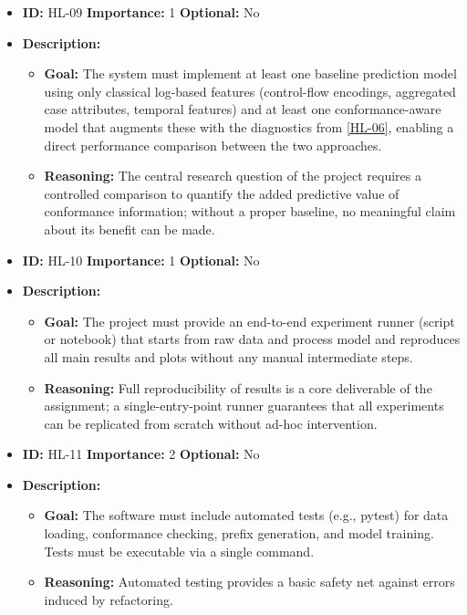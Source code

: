 \documentclass[12pt,a4paper]{article}
\begin{document}
\begin{itemize}
    \item \textbf{ID:} HL-09
 \textbf{Importance:} 1
 \textbf{Optional:} No
    \item \textbf{Description:}
    \begin{itemize}
        \item \textbf{Goal:} The system must implement at least one baseline prediction model using only classical log-based features (control-flow encodings, aggregated case attributes, temporal features) and at least one conformance-aware model that augments these with the diagnostics from \ref{HL-06}, enabling a direct performance comparison between the two approaches.
        \item \textbf{Reasoning:} The central research question of the project requires a controlled comparison to quantify the added predictive value of conformance information; without a proper baseline, no meaningful claim about its benefit can be made.
    \end{itemize}
\end{itemize}
\vspace{1.5em}

\begin{itemize}
    \item \textbf{ID:} HL-10
 \textbf{Importance:} 1
 \textbf{Optional:} No
    \item \textbf{Description:}
    \begin{itemize}
        \item \textbf{Goal:} The project must provide an end-to-end experiment runner (script or notebook) that starts from raw data and process model and reproduces all main results and plots without any manual intermediate steps.
        \item \textbf{Reasoning:} Full reproducibility of results is a core deliverable of the assignment; a single-entry-point runner guarantees that all experiments can be replicated from scratch without ad-hoc intervention.
    \end{itemize}
\end{itemize}
\vspace{1.5em}

\begin{itemize}
    \item \textbf{ID:} HL-11
 \textbf{Importance:} 2
 \textbf{Optional:} No
    \item \textbf{Description:}
    \begin{itemize}
        \item \textbf{Goal:} The software must include automated tests (e.g., pytest) for data loading, conformance checking, prefix generation, and model training. Tests must be executable via a single command.
        \item \textbf{Reasoning:} Automated testing provides a basic safety net against errors induced by refactoring.
    \end{itemize}
\end{itemize}
\vspace{1.5em}
\end{document}
